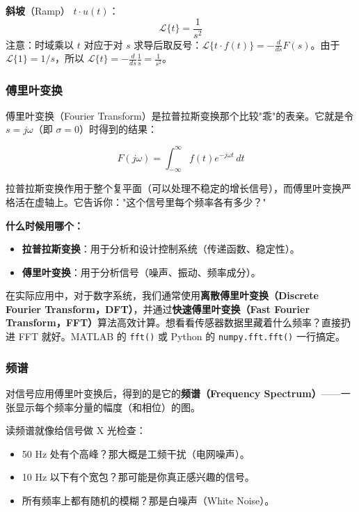 \documentclass[UTF8]{ctexart}
\begin{document}
\textbf{斜坡}（Ramp） $t \cdot u(t)$：
\[
\mathcal{L}\{t\} = \frac{1}{s^2}
\]
注意：时域乘以 $t$ 对应于对 $s$ 求导后取反号：$\mathcal{L}\{t \cdot f(t)\} = -\frac{d}{ds}F(s)$。由于 $\mathcal{L}\{1\} = 1/s$，所以 $\mathcal{L}\{t\} = -\frac{d}{ds}\frac{1}{s} = \frac{1}{s^2}$。

\subsubsection{傅里叶变换}

傅里叶变换（Fourier Transform）是拉普拉斯变换那个比较"乖"的表亲。它就是令 $s = j\omega$（即 $\sigma = 0$）时得到的结果：

\begin{equation}
F(j\omega) = \int_{-\infty}^{\infty} f(t) e^{-j\omega t} \, dt
\end{equation}

拉普拉斯变换作用于整个复平面（可以处理不稳定的增长信号），而傅里叶变换严格活在虚轴上。它告诉你："这个信号里每个频率各有多少？"

\textbf{什么时候用哪个：}
\begin{itemize}
    \item \textbf{拉普拉斯变换}：用于分析和设计控制系统（传递函数、稳定性）。
    \item \textbf{傅里叶变换}：用于分析信号（噪声、振动、频率成分）。
\end{itemize}

在实际应用中，对于数字系统，我们通常使用\textbf{离散傅里叶变换（Discrete Fourier Transform，DFT）}，并通过\textbf{快速傅里叶变换（Fast Fourier Transform，FFT）}算法高效计算。想看看传感器数据里藏着什么频率？直接扔进 FFT 就好。MATLAB 的 \texttt{fft()} 或 Python 的 \texttt{numpy.fft.fft()} 一行搞定。

\subsubsection{频谱}

对信号应用傅里叶变换后，得到的是它的\textbf{频谱（Frequency Spectrum）}——一张显示每个频率分量的幅度（和相位）的图。

读频谱就像给信号做 X 光检查：
\begin{itemize}
    \item 50 Hz 处有个高峰？那大概是工频干扰（电网噪声）。
    \item 10 Hz 以下有个宽包？那可能是你真正感兴趣的信号。
    \item 所有频率上都有随机的模糊？那是白噪声（White Noise）。
\end{itemize}
\end{document}
